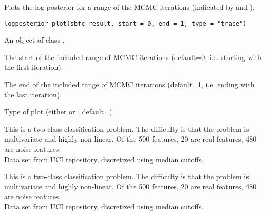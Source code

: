 \documentclass[a4paper]{book}
\begin{document}
%
\begin{References}\relax
{}



\end{References}
%
\begin{Description}\relax
Plots the log posterior for a range of the MCMC iterations (indicated by  and ).
\end{Description}
%
\begin{Usage}
\begin{verbatim}
logposterior_plot(sbfc_result, start = 0, end = 1, type = "trace")
\end{verbatim}
\end{Usage}
%
\begin{Arguments}
\begin{ldescription}
\item[\code{sbfc\_result}] An object of class .

\item[\code{start}] The start of the included range of MCMC iterations (default=0, i.e. starting with the first iteration).

\item[\code{end}] The end of the included range of MCMC iterations (default=1, i.e. ending with the last iteration).

\item[\code{type}] Type of plot (either  or , default=).
\end{ldescription}
\end{Arguments}
%
\begin{Description}\relax
This is a two-class classification problem. 
The difficulty is that the problem is multivariate and highly non-linear. 
Of the 500 features, 20 are real features, 480 are noise features. \\{}
Data set from UCI repository, discretized using median cutoffs.

This is a two-class classification problem. 
The difficulty is that the problem is multivariate and highly non-linear. 
Of the 500 features, 20 are real features, 480 are noise features. \\{}
Data set from UCI repository, discretized using median cutoffs.
\end{Description}
\end{document}
